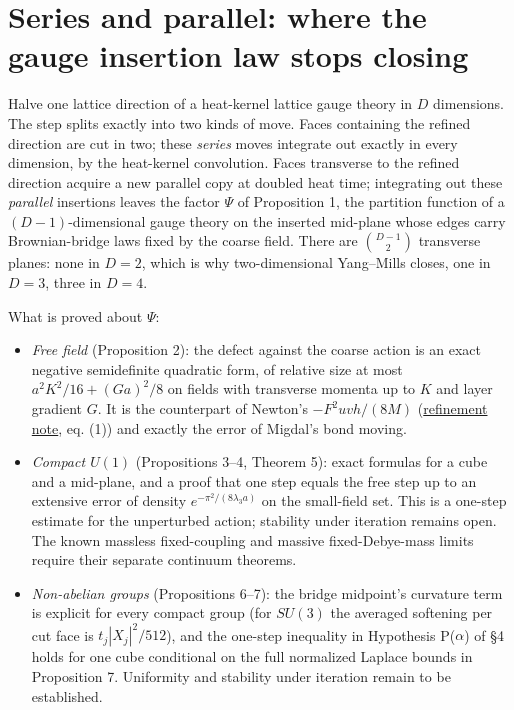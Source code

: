 \documentclass[11pt,a4paper]{article}
\newcommand{\tightlist}{\setlength{\itemsep}{0pt}\setlength{\parskip}{0pt}}
\begin{document}
\hypertarget{series-and-parallel-where-the-gauge-insertion-law-stops-closing}{%
\section{Series and parallel: where the gauge insertion law stops
closing}\label{series-and-parallel-where-the-gauge-insertion-law-stops-closing}}

Halve one lattice direction of a heat-kernel lattice gauge theory in
\(D\) dimensions. The step splits exactly into two kinds of move. Faces
containing the refined direction are cut in two; these \emph{series}
moves integrate out exactly in every dimension, by the heat-kernel
convolution. Faces transverse to the refined direction acquire a new
parallel copy at doubled heat time; integrating out these
\emph{parallel} insertions leaves the factor \(\Psi\) of Proposition 1,
the partition function of a \((D-1)\)-dimensional gauge theory on the
inserted mid-plane whose edges carry Brownian-bridge laws fixed by the
coarse field. There are \(\binom{D-1}{2}\) transverse planes: none in
\(D=2\), which is why two-dimensional Yang--Mills closes, one in
\(D=3\), three in \(D=4\).

What is proved about \(\Psi\):

\begin{itemize}
\tightlist
\item
  \emph{Free field} (Proposition 2): the defect against the coarse
  action is an exact negative semidefinite quadratic form, of relative
  size at most \(a^2K^2/16+(Ga)^2/8\) on fields with transverse momenta
  up to \(K\) and layer gradient \(G\). It is the counterpart of
  Newton's \(-F^2uvh/(8M)\)
  (\href{refinement-composition-and-limit.md}{refinement note}, eq. (1))
  and exactly the error of Migdal's bond moving.
\item
  \emph{Compact \(U(1)\)} (Propositions 3--4, Theorem 5): exact formulas
  for a cube and a mid-plane, and a proof that one step equals the free
  step up to an extensive error of density \(e^{-\pi^2/(8\lambda_3a)}\)
  on the small-field set. This is a one-step estimate for the
  unperturbed action; stability under iteration remains open. The known
  massless fixed-coupling and massive fixed-Debye-mass limits require
  their separate continuum theorems.
\item
  \emph{Non-abelian groups} (Propositions 6--7): the bridge midpoint's
  curvature term is explicit for every compact group (for \(SU(3)\) the
  averaged softening per cut face is \(t_j|X_j|^2/512\)), and the
  one-step inequality in Hypothesis P(\(\alpha\)) of §4 holds for one
  cube conditional on the full normalized Laplace bounds in Proposition
  7. Uniformity and stability under iteration remain to be established.
\end{itemize}
\end{document}
